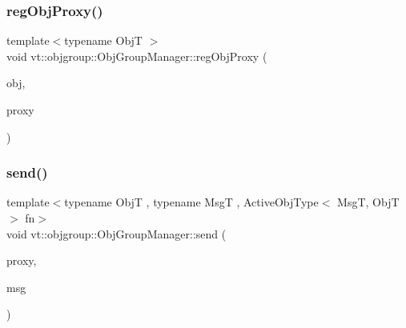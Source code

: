 \subsubsection{\texorpdfstring{reg\+Obj\+Proxy()}{regObjProxy()}}
{\footnotesize\ttfamily template$<$typename ObjT $>$ \\
void vt\+::objgroup\+::\+Obj\+Group\+Manager\+::reg\+Obj\+Proxy (\begin{DoxyParamCaption}\item[{ObjT $\ast$}]{obj,  }\item[{\hyperlink{namespacevt_ad7cae989df485fccca57f0792a880a8e}{Obj\+Group\+Proxy\+Type}}]{proxy }\end{DoxyParamCaption})\hspace{0.3cm}{\ttfamily [private]}}

\mbox{\label{structvt_1_1objgroup_1_1_obj_group_manager_a4b45c347778fda185d97b4c6af4ec58e}} 
\subsubsection{\texorpdfstring{send()}{send()}\hspace{0.1cm}{\footnotesize\ttfamily [1/2]}}
{\footnotesize\ttfamily template$<$typename ObjT , typename MsgT , Active\+Obj\+Type$<$ Msg\+T, Obj\+T $>$ fn$>$ \\
void vt\+::objgroup\+::\+Obj\+Group\+Manager\+::send (\begin{DoxyParamCaption}\item[{\hyperlink{structvt_1_1objgroup_1_1_obj_group_manager_adba6c8ecb0f4c30e719f1abb995cfc9b}{Proxy\+Elm\+Type}$<$ ObjT $>$}]{proxy,  }\item[{\hyperlink{namespacevt_ab2b3d506ec8e8d1540aede826d84a239}{Msg\+Shared\+Ptr}$<$ MsgT $>$}]{msg }\end{DoxyParamCaption})}

\mbox{\label{structvt_1_1objgroup_1_1_obj_group_manager_a58abda8b7d1372bea7ca061402e69c75}} 
